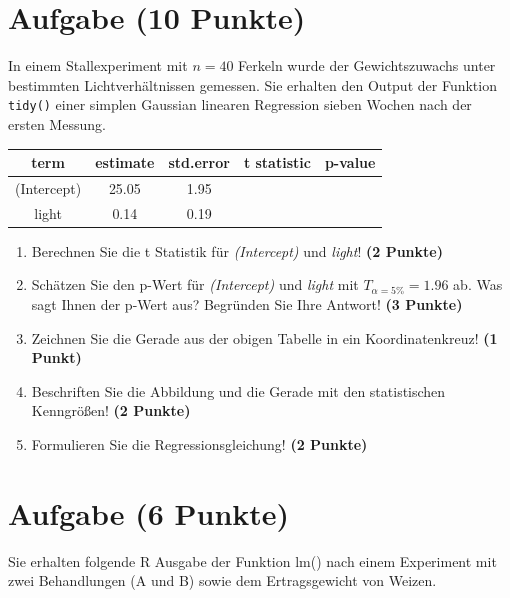 \documentclass[a4paper, 10pt]{scrartcl}\usepackage[]{graphicx}\usepackage[]{xcolor}
\begin{document}
\section{Aufgabe \hfill (10 Punkte)}



In einem Stallexperiment mit $n = 40$ Ferkeln wurde der
Gewichtszuwachs unter bestimmten Lichtverh{\"a}ltnissen gemessen. Sie erhalten
den \Rlogo Output der Funktion \texttt{tidy()} einer simplen Gaussian linearen
Regression sieben Wochen nach der ersten Messung.

\begin{table}[!h]
\centering\begingroup\fontsize{14}{16}\selectfont

\begin{tabular}{ccccc}
\toprule
term & estimate & std.error & t statistic & p-value\\
\midrule
(Intercept) & 25.05 & 1.95 &  & \\
light & 0.14 & 0.19 &  & \\
\bottomrule
\end{tabular}
\endgroup{}
\end{table}



\begin{enumerate}
\item Berechnen Sie die t Statistik f{\"u}r \textit{(Intercept)} und
  \textit{light}! \textbf{(2 Punkte)}
\item Sch{\"a}tzen Sie den p-Wert f{\"u}r \textit{(Intercept)} und
  \textit{light} mit $T_{\alpha = 5\%} = 1.96$ ab. Was sagt Ihnen der p-Wert aus?
  Begr{\"u}nden Sie Ihre Antwort! \textbf{(3 Punkte)}
\item Zeichnen Sie die Gerade aus der obigen Tabelle in ein Koordinatenkreuz! \textbf{(1 Punkt)}
\item Beschriften Sie die Abbildung und die Gerade mit den statistischen
  Kenngr{\"o}{\ss}en! \textbf{(2 Punkte)}
\item Formulieren Sie die Regressionsgleichung! \textbf{(2 Punkte)}
\end{enumerate} 
\clearpage

\section{Aufgabe \hfill (6 Punkte)}

Sie erhalten folgende R Ausgabe der Funktion lm() nach einem Experiment mit
zwei Behandlungen (A und B) sowie dem Ertragsgewicht von Weizen.
\end{document}
